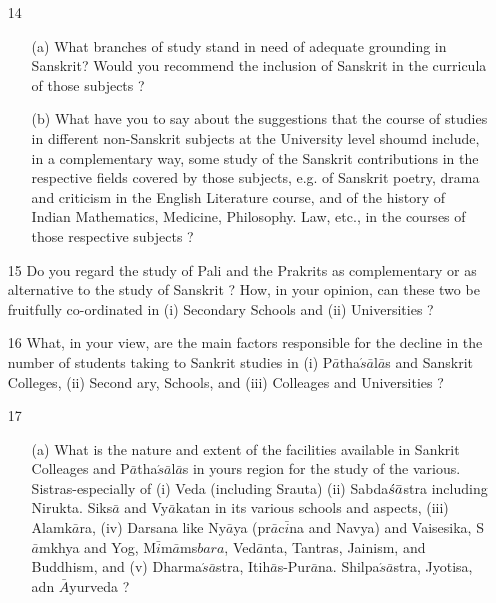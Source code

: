 {\rm 
\begin{itemize}
\item[14] \begin{itemize}
                 \item[(a)] What branches of study stand in need of adequate grounding in Sanskrit? Would you recommend the inclusion of Sanskrit in the curricula of those subjects ?
                 
                 \item[(b)] What have you to say about the suggestions that the course of studies in different non-Sanskrit subjects at the University level shoumd include, in a complementary way, some study of the Sanskrit contributions in the respective fields covered by those subjects, e.g. of Sanskrit poetry, drama and criticism in the English Literature course, and of the history of Indian Mathematics, Medicine, Philosophy. Law, etc., in the courses of those respective subjects ?
              \end{itemize}        
              
    \item[15] Do you regard the study of Pali and the Prakrits as complementary or as alternative to the study of Sanskrit ? How, in your opinion, can these two be fruitfully co-ordinated in (i) Secondary Schools and (ii) Universities ?          
     
     \item[16] What, in your view, are the main factors responsible for the decline in the number of students taking to Sankrit studies in (i) P$\bar{a}$tha$\acute{s}\bar{a}$l$\bar{a}$s and Sanskrit Colleges, (ii) Second ary, Schools, and (iii) Colleages and Universities ?         
      
      \item[17] \begin{itemize}
                 
                 \item[(a)] What is the nature and extent of the facilities available in Sankrit Colleages and P$\bar{a}$tha$\acute{s}\bar{a}$l$\bar{a}$s in yours region for the study of the various. Sistras-especially of (i) Veda (including Srauta) (ii) Sabda$\acute{s}\bar{a}\- $stra including Nirukta. Siks$\bar{a}$ and Vy$\bar{a}$katan in its various schools and aspects, (iii) Alamk$\bar{a}$ra, (iv) Darsana like Ny$\bar{a}$ya (pr$\bar{a}$c$\bar{i}$na and Navya) and Vaisesika, S$\bar{a}$mkhya and Yog, M$\bar{i}$m$\bar{a}$ms$bar{a}$, Ved$\bar{a}$nta, Tantras, Jainism, and Buddhism, and (v) Dharma$\acute{s}\bar{a}$stra, Itih$\bar{a}$s-Pur$\bar{a}$na. Shilpa$\acute{s}\bar{a}$stra, Jyotisa, adn $\bar{A}$yurveda ?
                 

\end{itemize}
\end{itemize}}
